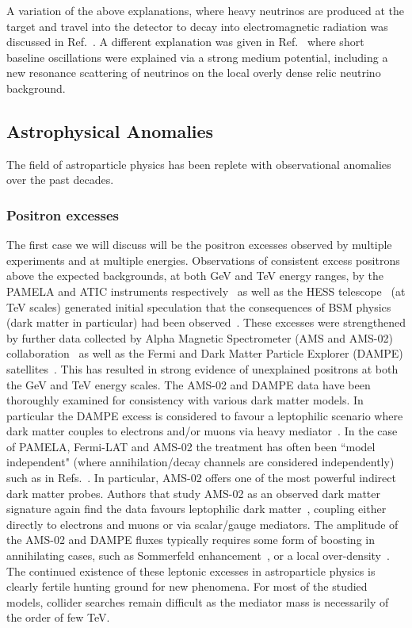 \documentclass[10pt]{article}
\begin{document}
A variation of the above explanations, where heavy neutrinos are produced at the target and travel into the detector to decay into electromagnetic radiation was discussed in Ref.~\cite{Fischer:2019fbw}.
A different explanation was given in Ref.~\cite{Asaadi:2017bhx} where 
short baseline oscillations were explained via a strong medium potential, including a new resonance scattering of neutrinos on the local overly dense relic neutrino background. 


\subsection{Astrophysical Anomalies}
\label{sec:astrophysics}
%
The field of astroparticle physics has been replete with observational anomalies over the past decades.

\subsubsection{Positron excesses}
%
The first case we will discuss will be the positron excesses observed by multiple experiments and at multiple energies. Observations of consistent excess positrons above the expected backgrounds, at both GeV and TeV energy ranges, by the PAMELA and ATIC instruments respectively~\cite{PAMELA:2008gwm,Adriani:2008zq,PPB-BETS:2008zzu} as well as the HESS telescope~\cite{HESS:2008ibn} (at TeV scales) generated initial speculation that the consequences of BSM physics (dark matter in particular) had been observed~\cite{Hooper:2003ad,Delahaye:2007fr,Nardi:2008ix}. These excesses were strengthened by further data collected by Alpha Magnetic Spectrometer (AMS and AMS-02) collaboration~\cite{AMS:2019rhg} as well as the Fermi and Dark Matter Particle Explorer (DAMPE) satellites~\cite{Fermi-LAT:2017bpc,DAMPE:2017fbg}. This has resulted in strong evidence of unexplained positrons at both the GeV and TeV energy scales. The AMS-02 and DAMPE data have been thoroughly examined for consistency with various dark matter models. In particular the DAMPE excess is considered to favour a leptophilic scenario where dark matter couples to electrons and/or muons via  heavy mediator~\cite{Fan:2017sor,Yuan:2017ysv,Yang:2017cjm}. In the case of PAMELA, Fermi-LAT and AMS-02 the treatment has often been ``model independent" (where annihilation/decay channels are considered independently) such as in Refs.~\cite{Cirelli:2008pk, DiMauro:2015jxa}. In particular, AMS-02 offers one of the most powerful indirect dark matter probes. Authors that study AMS-02 as an observed dark matter signature again find the data favours leptophilic dark matter~\cite{Dev:2013hka, Profumo:2019pob,Li:2017nac}, coupling either directly to electrons and muons or via scalar/gauge mediators. The amplitude of the AMS-02 and DAMPE fluxes typically requires some form of boosting in annihilating cases, such as Sommerfeld enhancement~\cite{Das:2019vxm}, or a local over-density~\cite{Fan:2017sor,Yuan:2017ysv,Yang:2017cjm}. The continued existence of these leptonic excesses in astroparticle physics is clearly fertile hunting ground for new phenomena. For most of the studied models, collider searches remain difficult as the mediator mass is necessarily of the order of few TeV.   
\end{document}
